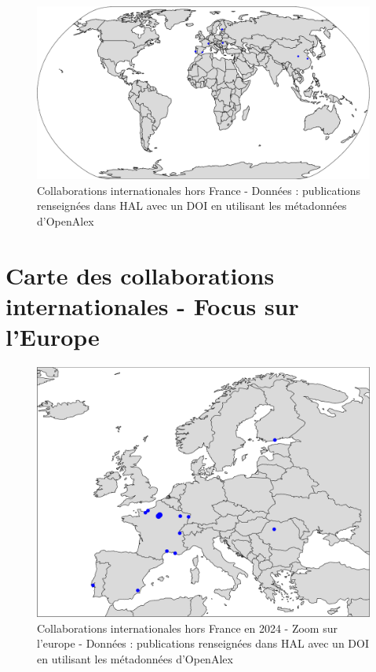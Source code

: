 \documentclass[french, 11pt]{dibiso/biso}
\begin{document}
\begin{figure}[!h]
  \hspace{-.1\textwidth}\includegraphics[width=1.2\textwidth]{figures/collaboration_map_world.pdf}
  \caption{Collaborations internationales hors France - Données : publications renseignées dans HAL avec un DOI en utilisant les métadonnées d'OpenAlex}
  \label{fig_collab_map}
\end{figure}







\pagebreak

\section{Carte des collaborations internationales - Focus sur l’Europe}

\begin{figure}[!h]
  \includegraphics[width=\textwidth]{figures/collaboration_map_europe.pdf}
  \caption{Collaborations internationales hors France en 2024 - Zoom sur l'europe - Données : publications renseignées dans HAL avec un DOI en utilisant les métadonnées d'OpenAlex}
  \label{fig_collab_map_europe}
\end{figure}
\end{document}
